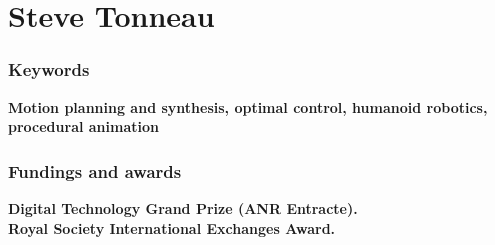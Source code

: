 \documentclass{tccv}
\begin{document}
\part{Steve Tonneau}

\section{Keywords}
\textbf{Motion planning and synthesis, optimal control, humanoid robotics, procedural animation}

\section{Fundings and awards}
\textbf{Digital Technology Grand Prize (ANR Entracte). \\ Royal Society International Exchanges Award.}
\end{document}
